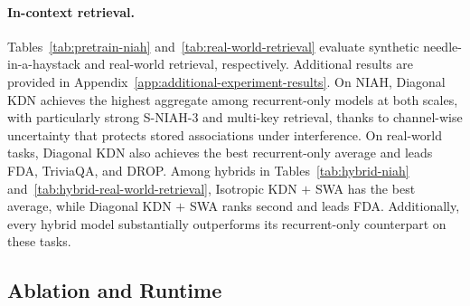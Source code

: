 \documentclass{article} %
\begin{document}
\paragraph{In-context retrieval.}
Tables~\ref{tab:pretrain-niah} and~\ref{tab:real-world-retrieval} evaluate synthetic
needle-in-a-haystack and real-world retrieval, respectively. Additional results are provided in
Appendix~\ref{app:additional-experiment-results}.
On NIAH, Diagonal KDN
achieves the highest aggregate among recurrent-only models at both scales, with particularly strong
S-NIAH-3 and multi-key retrieval, thanks to channel-wise uncertainty that protects stored
associations under interference. On real-world tasks, Diagonal KDN
also achieves the best recurrent-only average and leads FDA, TriviaQA, and DROP. Among hybrids in
Tables~\ref{tab:hybrid-niah} and~\ref{tab:hybrid-real-world-retrieval},
Isotropic KDN $+$ SWA has the best average, while Diagonal KDN $+$ SWA ranks second and leads FDA.
Additionally, every hybrid model substantially outperforms its recurrent-only counterpart on these
tasks.

\FloatBarrier

\subsection{Ablation and Runtime}
\label{sec:ablation-runtime}
\end{document}
